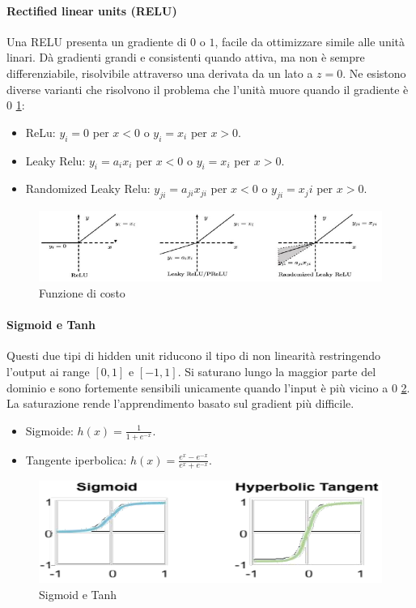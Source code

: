 			\paragraph{Rectified linear units (RELU)}
			Una RELU presenta un gradiente di $0$ o $1$, facile da ottimizzare simile alle unit\`a linari.
			D\`a gradienti grandi e consistenti quando attiva, ma non \`e sempre differenziabile, risolvibile attraverso una derivata da un lato a $z=0$.
			Ne esistono diverse varianti che risolvono il problema che l'unit\`a muore quando il gradiente \`e $0$ \ref{fig:chapter11-07}:
			\begin{multicols}{2}
				\begin{itemize}
					\item ReLu: $y_i = 0$ per $x < 0$ o $y_i = x_i$ per $x >0$.
					\item Leaky Relu: $y_i = a_ix_i$ per $x < 0$ o $y_i = x_i$ per $x >0$.
					\item Randomized Leaky Relu: $y_{ji} = a_{ji}x_{ji}$ per $x < 0$ o $y_{ji} = x_{j}i$ per $x >0$.
				\end{itemize}
			\end{multicols}
			\begin{figure}
				\centering
				\includegraphics[width=0.8\linewidth]{imgs/chapter11/img7}
				\caption{Funzione di costo}
				\label{fig:chapter11-07}
			\end{figure}

			\paragraph{Sigmoid e Tanh}
			Questi due tipi di hidden unit riducono il tipo di non linearit\`a restringendo l'output ai range $[0,1]$ e $[-1,1]$.
			Si saturano lungo la maggior parte del dominio e sono fortemente sensibili unicamente quando l'input \`e pi\`u vicino a $0$ \ref{fig:chapter11-08}.
			La saturazione rende l'apprendimento basato sul gradient pi\`u difficile.
			\begin{multicols}{2}
				\begin{itemize}
					\item Sigmoide: $h(x) = \frac{1}{1+e^{-x}}$.
					\item Tangente iperbolica: $h(x) = \frac{e^x-e^{-x}}{e^x+e^{-x}}$.
				\end{itemize}
			\end{multicols}
			\begin{figure}
				\centering
				\includegraphics[width=0.6\linewidth]{imgs/chapter11/img8}
				\caption{Sigmoid e Tanh}
				\label{fig:chapter11-08}
			\end{figure}

